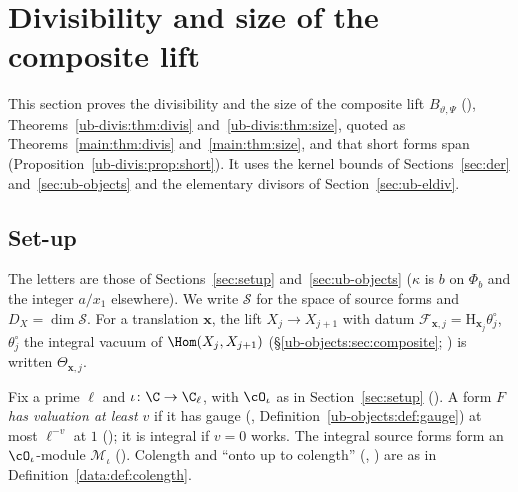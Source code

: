 \section{Divisibility and size of the composite lift}\label{sec:ub-divis}

This section proves the divisibility and the size of the composite lift $B_{\vartheta,\Psi}$
(), Theorems~\ref{ub-divis:thm:divis} and~\ref{ub-divis:thm:size},
quoted as Theorems~\ref{main:thm:divis} and~\ref{main:thm:size}, and that short forms span
(Proposition~\ref{ub-divis:prop:short}). It uses the kernel bounds of Sections~\ref{sec:der}
and~\ref{sec:ub-objects} and the elementary divisors of Section~\ref{sec:ub-eldiv}.

\subsection{Set-up}

The letters are those of Sections~\ref{sec:setup} and~\ref{sec:ub-objects} ($\kappa$ is $b$ on
$\Phi_b$ and the integer $a/x_1$ elsewhere). We write $\mathcal S$ for the space of source forms
and $D_X=\dim\mathcal S$. For a
translation $\mathbf x$, the lift $X_j\to X_{j+1}$ with datum
$\mathcal F_{\mathbf x,j}=\mathrm H_{\mathbf x_j}\theta^\circ_j$, $\theta^\circ_j$ the integral vacuum of
$\Hom(X_j,X_{j+1})$ (\S\ref{ub-objects:sec:composite}; ) is written $\Theta_{\mathbf x,j}$.

\begin{definition}\label{ub-divis:def:val}
Fix a prime $\ell$ and $\iota\colon\C\to\C_\ell$, with $\cO_\iota$ as in Section~\ref{sec:setup}
(). A form $F$ \emph{has valuation at least $v$} if it has gauge
(, Definition~\ref{ub-objects:def:gauge}) at most $\ell^{-v}$ at $1$
(); it is integral if $v=0$ works. The integral source forms form an
$\cO_\iota$-module $\mathcal M_\iota$ (). Colength and
``onto up to colength'' (, ) are as in
Definition~\ref{data:def:colength}.
\end{definition}

